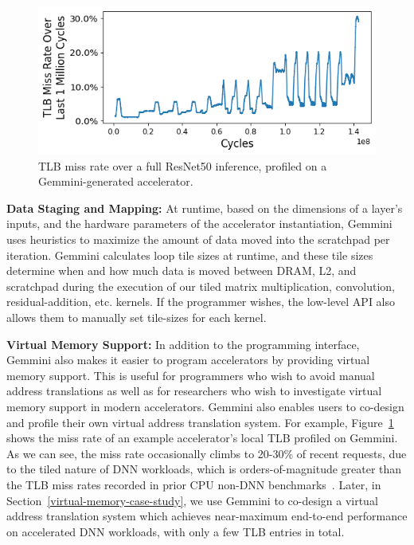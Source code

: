 \begin{figure}[t]
    \centering
    \includegraphics[width=\linewidth]{fig/tlb_hit_rate_running.png}
    \caption{TLB miss rate over a full ResNet50 inference, profiled on a Gemmini-generated accelerator.}
    \label{fig:tlb_hit_rate}
    \vspace{-0.2in}
\end{figure}

\textbf{Data Staging and Mapping:}
At runtime, based on the dimensions of a layer's inputs, and the hardware parameters of the accelerator instantiation, Gemmini uses heuristics to maximize the amount of data moved into the scratchpad per iteration.
Gemmini calculates loop tile sizes at runtime, and these tile sizes determine when and how much data is moved between DRAM, L2, and scratchpad during the execution of our tiled matrix multiplication, convolution, residual-addition, etc. kernels.
If the programmer wishes, the low-level API also allows them to manually set tile-sizes for each kernel.

\textbf{Virtual Memory Support:}
In addition to the programming interface, Gemmini also makes it easier to program accelerators by providing virtual memory support. This is useful for programmers who wish to avoid manual address translations as well as for researchers who wish to investigate virtual memory support in modern accelerators.
Gemmini also enables users to co-design and profile their own virtual address translation system. For example, Figure~\ref{fig:tlb_hit_rate} shows the miss rate of an example accelerator's local TLB profiled on Gemmini. As we can see, the miss rate occasionally climbs to 20-30\% of recent requests, due to the tiled nature of DNN workloads, which is orders-of-magnitude greater than the TLB miss rates recorded in prior CPU non-DNN benchmarks~\cite{lustig2013tlb}.
Later, in Section~\ref{virtual-memory-case-study}, we use Gemmini to co-design a virtual address translation system which achieves near-maximum end-to-end performance on accelerated DNN workloads, with only a few TLB entries in total.

